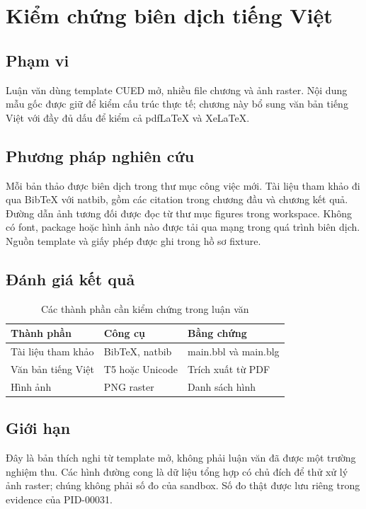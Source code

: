 \chapter{Kiểm chứng biên dịch tiếng Việt}
\section{Phạm vi}
Luận văn dùng template CUED mở, nhiều file chương và ảnh raster. Nội dung mẫu
gốc được giữ để kiểm cấu trúc thực tế; chương này bổ sung văn bản tiếng Việt
với đầy đủ dấu để kiểm cả pdfLaTeX và XeLaTeX.

\section{Phương pháp nghiên cứu}
Mỗi bản thảo được biên dịch trong thư mục công việc mới. Tài liệu tham khảo
đi qua BibTeX với natbib, gồm các citation trong chương đầu và chương kết quả.
Đường dẫn ảnh tương đối được đọc từ thư mục figures trong workspace.
Không có font, package hoặc hình ảnh nào được tải qua mạng trong quá trình
biên dịch. Nguồn template và giấy phép được ghi trong hồ sơ fixture.

\section{Đánh giá kết quả}
\begin{table}[ht]\centering
\begin{tabular}{lll}\toprule
Thành phần & Công cụ & Bằng chứng \\
\midrule
Tài liệu tham khảo & BibTeX, natbib & main.bbl và main.blg \\
Văn bản tiếng Việt & T5 hoặc Unicode & Trích xuất từ PDF \\
Hình ảnh & PNG raster & Danh sách hình \\
\bottomrule\end{tabular}
\caption{Các thành phần cần kiểm chứng trong luận văn}
\end{table}

\section{Giới hạn}
Đây là bản thích nghi từ template mở, không phải luận văn đã được một trường
nghiệm thu. Các hình đường cong là dữ liệu tổng hợp có chủ đích để thử xử lý
ảnh raster; chúng không phải số đo của sandbox. Số đo thật được lưu riêng
trong evidence của PID-00031.

